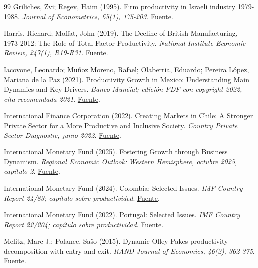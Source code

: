 \begin{thebibliography}{99}
 Griliches, Zvi; Regev, Haim (1995). Firm productivity in Israeli industry 1979-1988. \emph{Journal of Econometrics, 65(1), 175-203}. \href{https://www.sciencedirect.com/science/article/pii/030440769401601U}{Fuente}.

 Harris, Richard; Moffat, John (2019). The Decline of British Manufacturing, 1973-2012: The Role of Total Factor Productivity. \emph{National Institute Economic Review, 247(1), R19-R31}. \href{https://doi.org/10.1177/002795011924700112}{Fuente}.

 Iacovone, Leonardo; Muñoz Moreno, Rafael; Olaberria, Eduardo; Pereira López, Mariana de la Paz (2021). Productivity Growth in Mexico: Understanding Main Dynamics and Key Drivers. \emph{Banco Mundial; edición PDF con copyright 2022, cita recomendada 2021}. \href{https://documents1.worldbank.org/curated/en/099100103252224294/pdf/P17082908942250380867901fba9060dcbc.pdf}{Fuente}.

 International Finance Corporation (2022). Creating Markets in Chile: A Stronger Private Sector for a More Productive and Inclusive Society. \emph{Country Private Sector Diagnostic, junio 2022}. \href{https://www.ifc.org/content/dam/ifc/doc/mgrt/cpsd-chile.pdf}{Fuente}.

 International Monetary Fund (2025). Fostering Growth through Business Dynamism. \emph{Regional Economic Outlook: Western Hemisphere, octubre 2025, capítulo 2}. \href{https://www.imf.org/-/media/files/publications/reo/whd/2025/october/english/ch2.pdf}{Fuente}.

 International Monetary Fund (2024). Colombia: Selected Issues. \emph{IMF Country Report 24/83; capítulo sobre productividad}. \href{https://www.elibrary.imf.org/view/journals/002/2024/083/article-A001-en.xml}{Fuente}.

 International Monetary Fund (2022). Portugal: Selected Issues. \emph{IMF Country Report 22/204; capítulo sobre productividad}. \href{https://www.elibrary.imf.org/view/journals/002/2022/204/article-A001-en.xml}{Fuente}.

 Melitz, Marc J.; Polanec, Sašo (2015). Dynamic Olley-Pakes productivity decomposition with entry and exit. \emph{RAND Journal of Economics, 46(2), 362-375}. \href{https://doi.org/10.1111/1756-2171.12088}{Fuente}.


\end{thebibliography}
